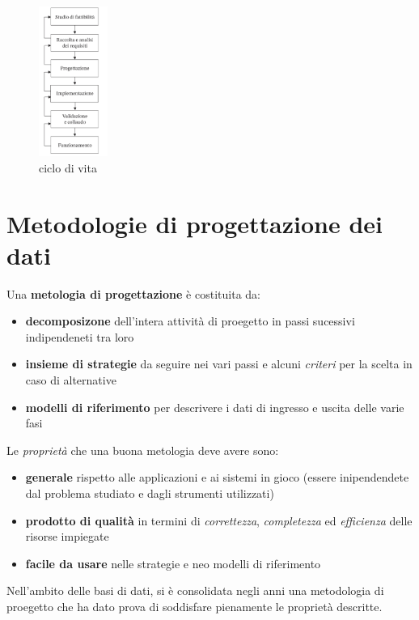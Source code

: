 \documentclass[a4paper, 12pt]{book}
\begin{document}
    \begin{figure}[H]
      \centering
      \includegraphics[width=0.2\textwidth, keepaspectratio]{images/cicloVita.jpeg}
      \caption{ciclo di vita}
    \end{figure}

    \section*{Metodologie di progettazione dei dati}
    Una \textbf{metologia di progettazione} è costituita da:
    \begin{itemize}
      \item \textbf{decomposizone} dell'intera attività di proegetto in passi sucessivi indipendeneti tra loro
      \item \textbf{insieme di strategie} da seguire nei vari passi e alcuni \textit{criteri} per la scelta in caso di alternative
      \item \textbf{modelli di riferimento} per descrivere i dati di ingresso e uscita delle varie fasi
    \end{itemize}

    Le \textit{proprietà} che una buona metologia deve avere sono:
    \begin{itemize}
      \item \textbf{generale} rispetto alle applicazioni e ai sistemi in gioco (essere inipendendete dal problema studiato e dagli strumenti utilizzati)
      \item \textbf{prodotto di qualità} in termini di \textit{correttezza}, \textit{completezza} ed \textit{efficienza} delle risorse impiegate
      \item \textbf{facile da usare} nelle strategie e neo modelli di riferimento
    \end{itemize}

    Nell'ambito delle basi di dati, si è consolidata negli anni una metodologia di proegetto che ha dato prova di soddisfare pienamente le proprietà descritte.
\end{document}
